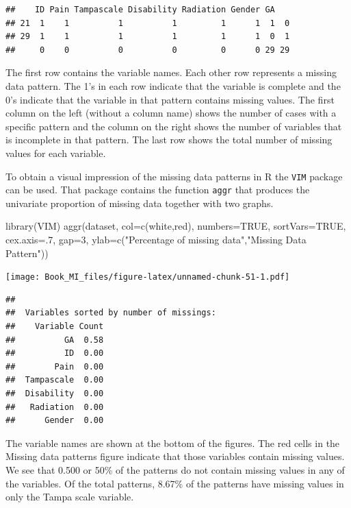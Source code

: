 \documentclass[
]{book}
\newenvironment{Shaded}{\begin{snugshade}}{\end{snugshade}}
\newcommand{\AttributeTok}[1]{\textcolor[rgb]{0.77,0.63,0.00}{#1}}
\newcommand{\ConstantTok}[1]{\textcolor[rgb]{0.00,0.00,0.00}{#1}}
\newcommand{\DecValTok}[1]{\textcolor[rgb]{0.00,0.00,0.81}{#1}}
\newcommand{\FunctionTok}[1]{\textcolor[rgb]{0.00,0.00,0.00}{#1}}
\newcommand{\NormalTok}[1]{#1}
\newcommand{\StringTok}[1]{\textcolor[rgb]{0.31,0.60,0.02}{#1}}
\begin{document}
\begin{verbatim}
##    ID Pain Tampascale Disability Radiation Gender GA   
## 21  1    1          1          1         1      1  1  0
## 29  1    1          1          1         1      1  0  1
##     0    0          0          0         0      0 29 29
\end{verbatim}

The first row contains the variable names. Each other row represents a missing data pattern. The 1's in each row indicate that the variable is complete and the 0's indicate that the variable in that pattern contains missing values. The first column on the left (without a column name) shows the number of cases with a specific pattern and the column on the right shows the number of variables that is incomplete in that pattern. The last row shows the total number of missing values for each variable.

To obtain a visual impression of the missing data patterns in R the \texttt{VIM} package can be used. That package contains the function \texttt{aggr} that produces the univariate proportion of missing data together with two graphs.

\begin{Shaded}
\begin{Highlighting}[]
\FunctionTok{library}\NormalTok{(VIM)}
\FunctionTok{aggr}\NormalTok{(dataset, }\AttributeTok{col=}\FunctionTok{c}\NormalTok{(}\StringTok{\textquotesingle{}white\textquotesingle{}}\NormalTok{,}\StringTok{\textquotesingle{}red\textquotesingle{}}\NormalTok{), }\AttributeTok{numbers=}\ConstantTok{TRUE}\NormalTok{, }\AttributeTok{sortVars=}\ConstantTok{TRUE}\NormalTok{, }\AttributeTok{cex.axis=}\NormalTok{.}\DecValTok{7}\NormalTok{, }\AttributeTok{gap=}\DecValTok{3}\NormalTok{, }\AttributeTok{ylab=}\FunctionTok{c}\NormalTok{(}\StringTok{"Percentage of missing data"}\NormalTok{,}\StringTok{"Missing Data Pattern"}\NormalTok{))}
\end{Highlighting}
\end{Shaded}

\texttt{[image: Book\_MI\_files/figure-latex/unnamed-chunk-51-1.pdf]}

\begin{verbatim}
## 
##  Variables sorted by number of missings: 
##    Variable Count
##          GA  0.58
##          ID  0.00
##        Pain  0.00
##  Tampascale  0.00
##  Disability  0.00
##   Radiation  0.00
##      Gender  0.00
\end{verbatim}

The variable names are shown at the bottom of the figures. The red cells in the Missing data patterns figure indicate that those variables contain missing values. We see that 0.500 or 50\% of the patterns do not contain missing values in any of the variables. Of the total patterns, 8.67\% of the patterns have missing values in only the Tampa scale variable.
\end{document}
